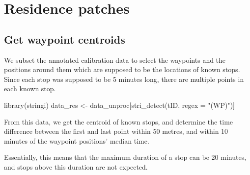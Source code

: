 \documentclass[]{scrreprt}
\newenvironment{Shaded}{}{}
\newcommand{\DataTypeTok}[1]{#1}
\newcommand{\KeywordTok}[1]{\textcolor[rgb]{0.00,0.00,1.00}{#1}}
\newcommand{\NormalTok}[1]{#1}
\newcommand{\StringTok}[1]{\textcolor[rgb]{0.00,0.50,0.50}{#1}}
\begin{document}
\hypertarget{residence-patches}{%
\section{Residence patches}\label{residence-patches}}

\hypertarget{get-waypoint-centroids}{%
\subsection{Get waypoint centroids}\label{get-waypoint-centroids}}

We subset the annotated calibration data to select the waypoints and the positions around them which are supposed to be the locations of known stops. Since each stop was supposed to be 5 minutes long, there are multiple points in each known stop.

\begin{Shaded}
\begin{Highlighting}[]
\KeywordTok{library}\NormalTok{(stringi)}
\NormalTok{data_res <-}\StringTok{ }\NormalTok{data_unproc[}\KeywordTok{stri_detect}\NormalTok{(tID, }\DataTypeTok{regex =} \StringTok{"(WP)"}\NormalTok{)]}
\end{Highlighting}
\end{Shaded}

From this data, we get the centroid of known stops, and determine the time difference between the first and last point within 50 metres, and within 10 minutes of the waypoint positions' median time.

Essentially, this means that the maximum duration of a stop can be 20 minutes, and stops above this duration are not expected.
\end{document}
